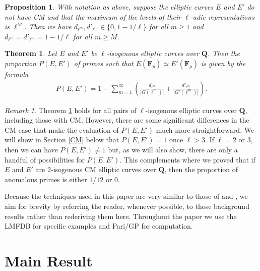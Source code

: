 \documentclass{amsart}
\newcommand{\F}{\mathbf{F}}
\newcommand{\Q}{\mathbf{Q}}
\numberwithin{equation}{section}
\theoremstyle{plain}
\newtheorem{thm}[equation]{Theorem}
\newtheorem{prop}[equation]{Proposition}
\theoremstyle{remark}
\newtheorem{rmk}[equation]{Remark}
\begin{document}
\begin{prop} \label{dmpropintro}
With notation as above, suppose the elliptic curves $E$ and $E'$ do not have CM and  that the maximum of the levels of their $\ell$-adic representations is $\ell^M$.  Then we have $d_{\ell^m}, d'_{\ell^m} \in \lbrace 0,1 - 1/\ell  \rbrace$ for all $m \geq 1$ and $d_{\ell^m} = d'_{\ell^m} = 1-1/\ell$ for all $m \geq M$.
\end{prop}

\begin{thm} \label{main_thm}
Let $E$ and $E'$ be $\ell$-isogenous elliptic curves over $\Q$.  Then the proportion $P(E,E')$ of primes such that $E(\F_p) \simeq E'(\F_p)$ is given by the formula
\begin{align} \label{main_form}
P(E,E') = 1-\sum_{m = 1}^\infty \left( \frac{d_{\ell^m}}{|G(\ell^m)|}  +  \frac{d'_{\ell^m}}{|G'(\ell^m)|}\right).
\end{align}
\end{thm}
 
\begin{rmk} \label{cmrmk}
Theorem \ref{main_thm} holds for all pairs of $\ell$-isogenous elliptic curves over $\Q$, including those with CM.  However, there are some significant differences in the CM case that make the evaluation of $P(E,E')$ much more straightforward.  We will show in Section \ref{CM} below that $P(E,E') =1$ once $\ell >3$.  If $\ell = 2$ or 3, then we can have $P(E,E') \ne 1$ but, as we will also show, there are only a handful of possibilities for $P(E,E')$.  This complements \cite[Thm.~1.11]{rnt} where we proved that if $E$ and $E'$ are 2-isogenous CM elliptic curves over $\Q$, then the proportion of anomalous primes is either $1/12$ or 0.
\end{rmk}

Because the techniques used in this paper are very similar to those of \cite{ck} and \cite{rnt}, we aim for brevity by referring the reader, whenever possible, to those background results rather than rederiving them here.  Throughout the paper we use the LMFDB \cite{lmfdb} for specific examples and Pari/GP \cite{PARI} for computation.

\section{Main Result} \label{main_section}
\end{document}
